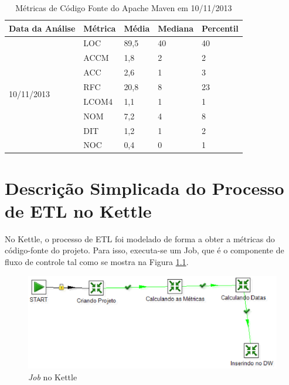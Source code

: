 \begin{apendicesenv}
\begin{table}[ht]
\centering
\begin{tabular}{|l|l|l|l|l|}
\hline
Data da Análise             & Métrica & Média & Mediana & Percentil \\ \hline
\multirow{8}{*}{10/11/2013} & LOC     & 89,5  & 40      & 40        \\ \cline{2-5} 
                            & ACCM    & 1,8   & 2       & 2         \\ \cline{2-5} 
                            & ACC     & 2,6   & 1       & 3         \\ \cline{2-5} 
                            & RFC     & 20,8  & 8       & 23        \\ \cline{2-5} 
                            & LCOM4   & 1,1   & 1       & 1         \\ \cline{2-5} 
                            & NOM     & 7,2   & 4       & 8         \\ \cline{2-5} 
                            & DIT     & 1,2   & 1       & 2         \\ \cline{2-5} 
                            & NOC     & 0,4   & 0       & 1         \\ \hline
\end{tabular}
\label{03/11}
\caption{Métricas de Código Fonte do Apache Maven em 10/11/2013}
\end{table}


\chapter{Descrição Simplicada do Processo de ETL no Kettle}

\label{implementação}

No Kettle, o processo de ETL foi modelado de forma a obter a métricas do código-fonte do projeto. Para isso, executa-se um Job, que é o componente de fluxo de controle tal como se mostra na Figura \ref{job}.


\begin{figure}[ht!]
\centering
\includegraphics[keepaspectratio=false,scale=0.60]{figuras/JOB.eps}
\caption{\textit{Job} no Kettle}
\label{job}
\end{figure}
\FloatBarrier


\end{apendicesenv}
